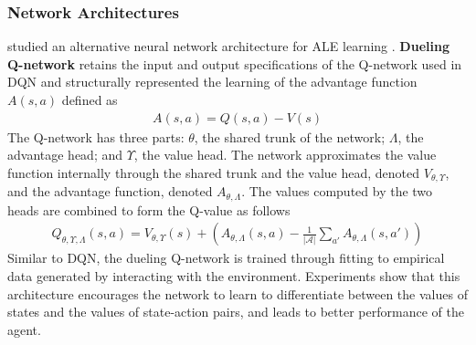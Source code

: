 \subsubsection{Network Architectures}
\citeauthor{DuelingNetworkArchitectures_Wang.Schaul.ea_} studied an alternative neural network architecture for ALE learning \cite{DuelingNetworkArchitectures_Wang.Schaul.ea_}.
\textbf{Dueling Q-network} retains the input and output specifications of the Q-network used in DQN and structurally represented the learning of the advantage function $A(s, a)$ defined as
\begin{align*}
    A(s, a) = Q(s, a) - V(s)
\end{align*}
The Q-network has three parts:
$\theta$, the shared trunk of the network; $\varLambda$, the advantage head; and $\varUpsilon$, the value head.
The network approximates the value function internally through the shared trunk and the value head, denoted $V_{\theta, \varUpsilon}$, and the advantage function, denoted $A_{\theta, \varLambda}$.
The values computed by the two heads are combined to form the Q-value as follows
\begin{align*}
    Q_{\theta, \varUpsilon, \varLambda}(s, a)
    = V_{\theta, \varUpsilon}(s)
    + \left( A_{\theta, \varLambda}(s, a)
    - \frac{1}{| \mathcal{A} | } \sum_{a'}A_{\theta, \varLambda}(s, a') \right)
\end{align*}
Similar to DQN, the dueling Q-network is trained through fitting to empirical data generated by interacting with the environment.
Experiments show that this architecture encourages the network to learn to differentiate between the values of states and the values of state-action pairs, and leads to better performance of the agent.

